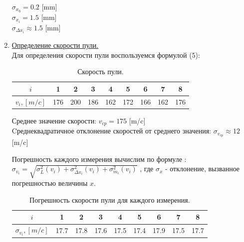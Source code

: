 \documentclass[11pt]{article}
\begin{document}
\begin{enumerate}
        \indent $\sigma_{x_0} = 0.2 $ [mm]  \\
        \indent $\sigma_{x_i} = 1.5 $ [mm]  \\
        \indent $\sigma_{\Delta x_i} \approx 1.5 $ [mm]

    \clearpage{}
    \item \underline{Определение скорости пули.} \\
        Для определения скорости пули воспользуемся формулой (5): \\
        \begin{table}[h]
                    \caption{Скорость пули.}
                    \begin{center}
                    \begin{tabular}{|c|c|c|c|c|c|c|c|c|}
                            \hline 
                                $i$ & 1 & 2 & 3 & 4 & 5 & 6 & 7 & 8 \\
                            \hline
                                $v_i , [m/c]$ &176&200&186&162&172&166&162&176 \\
                            \hline
                            \end{tabular}
                        \end{center}
        \end{table}    
        
        Среднее значение скорости: $v_{cp} = 175$ [m/c] \\
        Cреднеквадратичное отклонение скоростей от среднего значения: $\sigma_{v_{cp}} \approx 12$ [m/c]

        Погрешность каждого измерения вычислим по формуле : 
            $\sigma_{v_i} = \sqrt{\sigma^2_{L}(v_i) + \sigma^2_{\Delta x_i}(v_i) + \sigma^2_{m_i}(v_i)}$ , 
            где $\sigma_{x}$ - отклонение, вызванное погрешностью величины $x$.
        \begin{table}[h]
                    \caption{Погрешность скорости пули для каждого измерения.}
                    \begin{center}
                    \begin{tabular}{|c|c|c|c|c|c|c|c|c|}
                            \hline 
                                $i$ & 1 & 2 & 3 & 4 & 5 & 6 & 7 & 8 \\
                            \hline
                                $\sigma_{v_i} , [m/c]$ &17.7&17.8&17.6&17.5&17.4&17.9&17.5&17.7\\
                            \hline
                            \end{tabular}
                        \end{center}
        \end{table}    
        \\
        

\end{enumerate}
\end{document}
